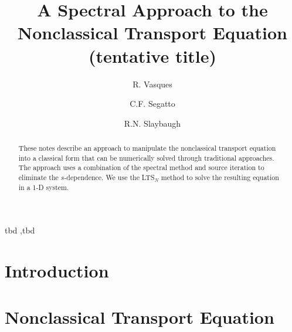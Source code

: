 \documentclass[preprint,12pt,authoryear]{elsarticle}
\begin{document}
\begin{frontmatter}

\title{A Spectral Approach to the Nonclassical Transport Equation\\
(tentative title)}

\author[ucb]{R. Vasques}
\author[ufrgs]{C.F. Segatto }
\author[ucb]{R.N. Slaybaugh}

\address[ucb]{University of California, Berkeley, Department of Nuclear Engineering, 4155 Etcheverry Hall \\ Berkeley, CA 94720-1730}
\address[ufrgs]{UFRGS - Federal University of Rio Grande do Sul, Av. Osvaldo Aranha 99, 90046-900\\ Porto Alegre, RS, Brazil}


\begin{abstract}

These notes describe an approach to manipulate the nonclassical transport equation into a classical form that can be numerically solved through traditional approaches. 
The approach uses a combination of the spectral method and source iteration to eliminate the $s$-dependence.
We use the LTS$_N$ method to solve the resulting equation in a 1-D system. 
 
\end{abstract}

\begin{keyword}
tbd \sep tbd 
\end{keyword}

\end{frontmatter}

\section{Introduction}\label{sec1}
\setcounter{section}{1}
\setcounter{equation}{0} 

\section{Nonclassical Transport Equation}\label{sec2}
\setcounter{section}{2}
\end{document}
